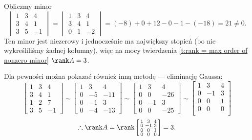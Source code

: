 \begin{solution}
    Obliczmy minor
    \[ \begin{vmatrix}
        1 & 3 & 4 \\
        3 & 4 & 1 \\
        3 & 5 & -1
    \end{vmatrix} = \begin{vmatrix}
        1 & 3 & 4 \\
        3 & 4 & 1 \\
        0 & 1 & -2
    \end{vmatrix} = (-8) + 0 + 12 - 0 - 1 - (-18) = 21 \neq 0. \]
    Ten minor jest niezerowy i jednocześnie ma największy stopień (bo nie wykreśliliśmy żadnej kolumny), więc na mocy twierdzenia \ref{t:rank = max order of nonzero minor} $\rank A = 3$.

    Dla pewności można pokazać również inną metodę --- eliminację Gaussa:
    \[ \begin{bmatrix}
        1 & 3 & 4 \\
        3 & 4 & 1 \\
        1 & 2 & 7 \\
        3 & 5 & -1
    \end{bmatrix} \sim \begin{bmatrix}
        1 & 3 & 4 \\
        0 & -5 & -11 \\
        0 & -1 & 3 \\
        0 & -4 & -13
    \end{bmatrix} \sim \begin{bmatrix}
        1 & 3 & 4 \\
        0 & 0 & -26 \\
        0 & -1 & 3 \\
        0 & 0 & -25
    \end{bmatrix} \sim \begin{bmatrix}
        1 & 3 & 4 \\
        0 & -1 & 3 \\
        0 & 0 & 1 \\
        0 & 0 & 0 \\
    \end{bmatrix} \]
    \[ \therefore \rank A = \rank \left[\begin{smallmatrix}
        1 & 3 & 4 \\
        0 & -1 & 3 \\
        0 & 0 & 1 \\
        0 & 0 & 0 \\
    \end{smallmatrix}\right] = 3. \]
\end{solution}
